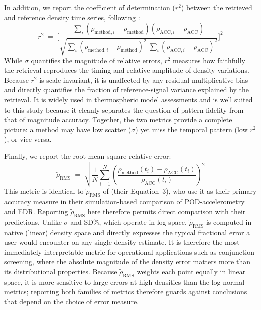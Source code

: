 \documentclass[draft]{agujournal2019}
\begin{document}
In addition, we report the coefficient of determination ($r^{2}$) between
the retrieved and reference density time series, following
:
\begin{equation}
r^{2} \;=\; \biggl[\frac{
  \sum_{i}(\rho_{\text{method},i} - \bar{\rho}_{\text{method}})
         (\rho_{\text{ACC},i} - \bar{\rho}_{\text{ACC}})
}{
  \sqrt{\sum_{i}(\rho_{\text{method},i} - \bar{\rho}_{\text{method}})^{2}
        \;\sum_{i}(\rho_{\text{ACC},i} - \bar{\rho}_{\text{ACC}})^{2}}
}\biggr]^{2}
\end{equation}
While $\sigma$ quantifies the magnitude of relative errors, $r^{2}$
measures how faithfully the retrieval reproduces the timing and relative
amplitude of density variations. Because $r^{2}$ is scale-invariant, it
is unaffected by any residual multiplicative bias and directly quantifies
the fraction of reference-signal variance explained by the retrieval.
It is widely used in thermospheric model assessments
\cite{Bruinsma2021ThermosphereStorms, Bruinsma2018SpaceOrbit} and is
well suited to this study because it cleanly separates the question of
pattern fidelity from that of magnitude accuracy.
Together, the two metrics provide a complete picture: a method may have
low scatter ($\sigma$) yet miss the temporal pattern (low $r^{2}$), or
vice versa.

Finally, we report the root-mean-square relative error:
\begin{equation}
\tilde{\rho}_{\text{RMS}} \;=\; \sqrt{\frac{1}{N}\sum_{i=1}^{N}
  \left(\frac{\rho_{\text{method}}(t_i) - \rho_{\text{ACC}}(t_i)}
             {\rho_{\text{ACC}}(t_i)}\right)^{\!2}}
\end{equation}
This metric is identical to $\tilde{\rho}_{\text{RMS}}$ of
 (their Equation~3), who use it as their primary
accuracy measure in their simulation-based comparison of POD-accelerometry
and EDR. Reporting $\tilde{\rho}_{\text{RMS}}$ here therefore permits
direct comparison with their predictions. Unlike $\sigma$ and SD\%, which
operate in log-space, $\tilde{\rho}_{\text{RMS}}$ is computed in native
(linear) density space and directly expresses the typical fractional error a
user would encounter on any single density estimate. It is therefore the
most immediately interpretable metric for operational applications such as
conjunction screening, where the absolute magnitude of the density error
matters more than its distributional properties. Because
$\tilde{\rho}_{\text{RMS}}$ weights each point equally in linear space, it
is more sensitive to large errors at high densities than the log-normal
metrics; reporting both families of metrics therefore guards against
conclusions that depend on the choice of error measure.
\end{document}
